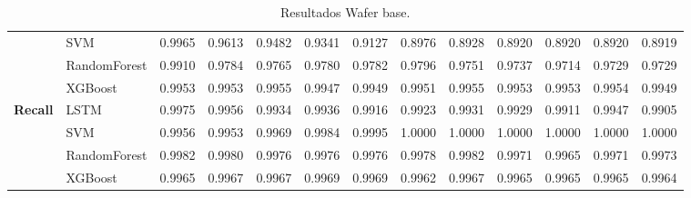 \begin{table}[h]
\begin{adjustbox}{max width=15cm}
\begin{tabular}{|c|l|r|r|r|r|r|r|r|r|r|r|r|}
			& SVM &  0.9965 &  0.9613 &  0.9482 &  0.9341 &  0.9127 &  0.8976 &  0.8928 &  0.8920 &  0.8920 &  0.8920 &  0.8919 \\
			& RandomForest &  0.9910 &  0.9784 &  0.9765 &  0.9780 &  0.9782 &  0.9796 &  0.9751 &  0.9737 &  0.9714 &  0.9729 &  0.9729 \\
			& XGBoost &  0.9953 &  0.9953 &  0.9955 &  0.9947 &  0.9949 &  0.9951 &  0.9955 &  0.9953 &  0.9953 &  0.9954 &  0.9949 \\
			\hline
			\textbf{Recall} & LSTM &  0.9975 &  0.9956 &  0.9934 &  0.9936 &  0.9916 &  0.9923 &  0.9931 &  0.9929 &  0.9911 &  0.9947 &  0.9905 \\
			& SVM &  0.9956 &  0.9953 &  0.9969 &  0.9984 &  0.9995 &  1.0000 &  1.0000 &  1.0000 &  1.0000 &  1.0000 &  1.0000 \\
			& RandomForest &  0.9982 &  0.9980 &  0.9976 &  0.9976 &  0.9976 &  0.9978 &  0.9982 &  0.9971 &  0.9965 &  0.9971 &  0.9973 \\
			& XGBoost &  0.9965 &  0.9967 &  0.9967 &  0.9969 &  0.9969 &  0.9962 &  0.9967 &  0.9965 &  0.9965 &  0.9965 &  0.9964 \\
			\hline
		\end{tabular}
	\end{adjustbox}
	\caption{Resultados Wafer base.}
	\label{tab:Wafer_base}
\end{table}
\newpage
